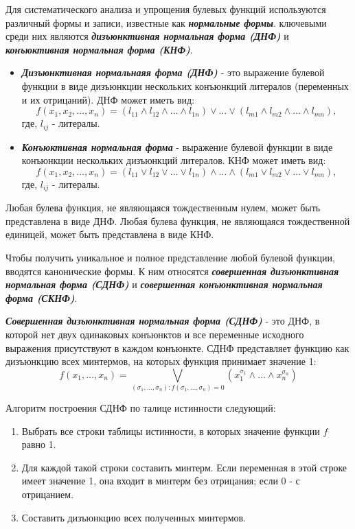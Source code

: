 \documentclass[12pt,letterpaper]{article}
\begin{document}
Для систематического анализа и упрощения булевых функций используются различный формы и записи, известные как \textbf{\emph{нормальные формы}}. ключевыми среди них являются \textbf{\emph{дизъюнктивная нормальная форма (ДНФ)}} и \textbf{\emph{конъюктивная нормальная форма (КНФ)}}.
\begin{itemize}
  \item \textbf{\emph{Дизъюнктивная нормальнаяя форма (ДНФ)}} - это выражение булевой функции в виде дизъюнкции нескольких конъюнкций литералов (переменных и их отрицаний). ДНФ может иметь вид:
  \[f(x_1, x_2, \ldots, x_n) = (l_{11} \wedge l_{12} \wedge \ldots \wedge l_{1n}) \vee \ldots \vee (l_{m1} \wedge l_{m2} \wedge \ldots \wedge l_{mn}),\]
  где, \(l_{ij}\) - литералы.
  \item \textbf{\emph{Конъюктивная нормальная форма}} - выражение булевой функции в виде конъюнкции нескольких дизъюнкций литералов. КНФ может иметь вид:
  \[f(x_1, x_2, \ldots, x_n) = (l_{11} \vee l_{12} \vee \ldots \vee l_{1n}) \wedge \ldots \wedge (l_{m1} \vee l_{m2} \vee \ldots \vee l_{mn}),\]
  где, \(l_{ij}\) - литералы.
\end{itemize}

Любая булева функция, не являющаяся тождественным нулем, может быть представлена в виде ДНФ. Любая булева функция, не являющаяся тождественной единицей, может быть представлена в виде КНФ.

Чтобы получить уникальное и полное представление любой булевой функции, вводятся канонические формы. К ним относятся \textbf{\emph{совершенная дизъюнктивная нормальная форма (СДНФ)}} и \textbf{\emph{совершенная конъюнктивная нормальная форма (СКНФ)}}.

\textbf{\emph{Совершенная дизъюнктивная нормальная форма (СДНФ)}} - это ДНФ, в которой нет двух одинаковых конъюнктов и все переменные исходного выражения присутствуют в каждом конъюнкте. СДНФ представляет функцию как дизъюнкцию всех минтермов, на которых функция принимает значение 1:
\[f(x_1, \ldots, x_n) = \bigvee_{(\sigma_1, \ldots, \sigma_n):f(\sigma_1, \ldots, \sigma_n) = 0} (x_1 ^ {\sigma_1} \wedge \ldots \wedge x_n ^ {\sigma_n})\]

Алгоритм построения СДНФ по талице истинности следующий:

\begin{enumerate}
  \item Выбрать все строки таблицы истинности, в которых значение функции \(f\) равно 1.
  \item Для каждой такой строки составить минтерм. Если переменная в этой строке имеет значение 1, она входит в минтерм без отрицания; если 0 - с отрицанием.
  \item Составить дизъюнкцию всех полученных минтермов.
\end{enumerate}
\end{document}
